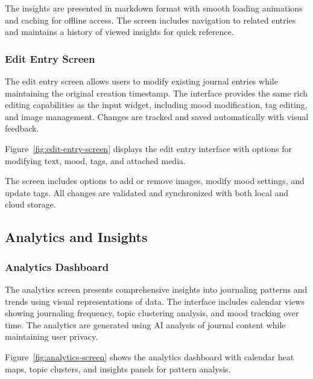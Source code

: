The insights are presented in markdown format with smooth loading animations and caching for offline access. The screen includes navigation to related entries and maintains a history of viewed insights for quick reference.

\subsubsection{Edit Entry Screen}

The edit entry screen allows users to modify existing journal entries while maintaining the original creation timestamp. The interface provides the same rich editing capabilities as the input widget, including mood modification, tag editing, and image management. Changes are tracked and saved automatically with visual feedback.

Figure~\ref{fig:edit-entry-screen} displays the edit entry interface with options for modifying text, mood, tags, and attached media.


The screen includes options to add or remove images, modify mood settings, and update tags. All changes are validated and synchronized with both local and cloud storage.

\subsection{Analytics and Insights}

\subsubsection{Analytics Dashboard}

The analytics screen presents comprehensive insights into journaling patterns and trends using visual representations of data. The interface includes calendar views showing journaling frequency, topic clustering analysis, and mood tracking over time. The analytics are generated using AI analysis of journal content while maintaining user privacy.

Figure~\ref{fig:analytics-screen} shows the analytics dashboard with calendar heat maps, topic clusters, and insights panels for pattern analysis.

